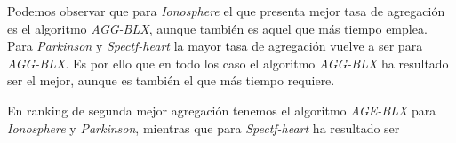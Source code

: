 \begin{table}[H]
    \centering
    \caption{Comparativas Métricas algoritmos genéticos}
    \label{Tabla:comparativas-algoritmos-geneticos}
\end{table}

Podemos observar que para \textit{Ionosphere} el que presenta mejor tasa de agregación es el algoritmo \textit{AGG-BLX}, aunque también es aquel que más 
tiempo emplea. Para \textit{Parkinson}  y  \textit{Spectf-heart} la mayor tasa de
 agregación vuelve a ser para \textit{AGG-BLX}. 
Es por ello que en todo los caso el algoritmo  \textit{AGG-BLX} ha resultado ser el mejor, aunque es también el que más tiempo requiere.  

En ranking de segunda mejor agregación tenemos el algoritmo \textit{AGE-BLX} para \textit{Ionosphere} y \textit{Parkinson}, mientras que para \textit{Spectf-heart} 
ha resultado ser 

